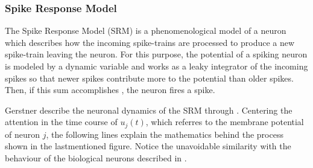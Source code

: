 \subsubsection{Spike Response Model}
\label{subsubsec:SRM}

The Spike Response Model (SRM) is a phenomenological model of a neuron which describes how the incoming spike-trains are processed to produce a new spike-train leaving the neuron.
For this purpose, the potential of a spiking neuron is modeled by a dynamic variable and works as a leaky integrator of the incoming spikes
so that newer spikes contribute more to the potential than
older spikes. 
Then, if this sum accomplishes , 
the neuron fires a spike.

Gerstner \etal \cite{gerstner2002spiking} describe the neuronal dynamics of the SRM through . 
Centering the attention in the time course of $u_{j}(t)$, which referres to the membrane potential of neuron $j$, the following lines explain the mathematics behind the process shown in the lastmentioned figure. Notice the unavoidable similarity with the behaviour of the biological neurons described in .

